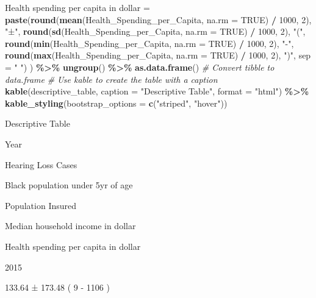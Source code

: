 \documentclass[
]{article}
\newenvironment{Shaded}{\begin{snugshade}}{\end{snugshade}}
\newcommand{\AttributeTok}[1]{\textcolor[rgb]{0.13,0.29,0.53}{#1}}
\newcommand{\CommentTok}[1]{\textcolor[rgb]{0.56,0.35,0.01}{\textit{#1}}}
\newcommand{\ConstantTok}[1]{\textcolor[rgb]{0.56,0.35,0.01}{#1}}
\newcommand{\DecValTok}[1]{\textcolor[rgb]{0.00,0.00,0.81}{#1}}
\newcommand{\FunctionTok}[1]{\textcolor[rgb]{0.13,0.29,0.53}{\textbf{#1}}}
\newcommand{\NormalTok}[1]{#1}
\newcommand{\OtherTok}[1]{\textcolor[rgb]{0.56,0.35,0.01}{#1}}
\newcommand{\SpecialCharTok}[1]{\textcolor[rgb]{0.81,0.36,0.00}{\textbf{#1}}}
\newcommand{\StringTok}[1]{\textcolor[rgb]{0.31,0.60,0.02}{#1}}
\begin{document}
\begin{Shaded}
\begin{Highlighting}[]
    \StringTok{\textasciigrave{}}\AttributeTok{Health spending per capita in dollar}\StringTok{\textasciigrave{}} \OtherTok{=} \FunctionTok{paste}\NormalTok{(}\FunctionTok{round}\NormalTok{(}\FunctionTok{mean}\NormalTok{(Health\_Spending\_per\_Capita, }\AttributeTok{na.rm =} \ConstantTok{TRUE}\NormalTok{) }\SpecialCharTok{/} \DecValTok{1000}\NormalTok{, }\DecValTok{2}\NormalTok{), }\StringTok{"±"}\NormalTok{, }\FunctionTok{round}\NormalTok{(}\FunctionTok{sd}\NormalTok{(Health\_Spending\_per\_Capita, }\AttributeTok{na.rm =} \ConstantTok{TRUE}\NormalTok{) }\SpecialCharTok{/} \DecValTok{1000}\NormalTok{, }\DecValTok{2}\NormalTok{), }\StringTok{"("}\NormalTok{, }\FunctionTok{round}\NormalTok{(}\FunctionTok{min}\NormalTok{(Health\_Spending\_per\_Capita, }\AttributeTok{na.rm =} \ConstantTok{TRUE}\NormalTok{) }\SpecialCharTok{/} \DecValTok{1000}\NormalTok{, }\DecValTok{2}\NormalTok{), }\StringTok{"{-}"}\NormalTok{, }\FunctionTok{round}\NormalTok{(}\FunctionTok{max}\NormalTok{(Health\_Spending\_per\_Capita, }\AttributeTok{na.rm =} \ConstantTok{TRUE}\NormalTok{) }\SpecialCharTok{/} \DecValTok{1000}\NormalTok{, }\DecValTok{2}\NormalTok{), }\StringTok{")"}\NormalTok{, }\AttributeTok{sep =} \StringTok{" "}\NormalTok{)}
\NormalTok{  ) }\SpecialCharTok{\%\textgreater{}\%} 
  \FunctionTok{ungroup}\NormalTok{() }\SpecialCharTok{\%\textgreater{}\%}
  \FunctionTok{as.data.frame}\NormalTok{()  }\CommentTok{\# Convert tibble to data.frame}
\CommentTok{\# Use kable to create the table with a caption}
\FunctionTok{kable}\NormalTok{(descriptive\_table, }\AttributeTok{caption =} \StringTok{"Descriptive Table"}\NormalTok{, }\AttributeTok{format =} \StringTok{"html"}\NormalTok{) }\SpecialCharTok{\%\textgreater{}\%}
  \FunctionTok{kable\_styling}\NormalTok{(}\AttributeTok{bootstrap\_options =} \FunctionTok{c}\NormalTok{(}\StringTok{"striped"}\NormalTok{, }\StringTok{"hover"}\NormalTok{))}
\end{Highlighting}
\end{Shaded}

Descriptive Table

Year

Hearing Loss Cases

Black population under 5yr of age

Population Insured

Median household income in dollar

Health spending per capita in dollar

2015

133.64 ± 173.48 ( 9 - 1106 )
\end{document}
